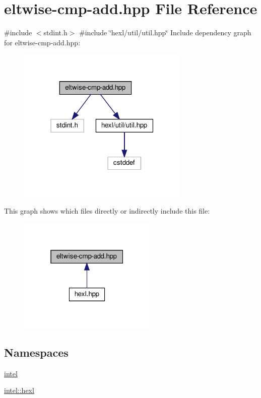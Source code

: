 \hypertarget{eltwise-cmp-add_8hpp}{}\section{eltwise-\/cmp-\/add.hpp File Reference}
\label{eltwise-cmp-add_8hpp}
{\ttfamily \#include $<$stdint.\+h$>$}\newline
{\ttfamily \#include \char`\"{}hexl/util/util.\+hpp\char`\"{}}\newline
Include dependency graph for eltwise-\/cmp-\/add.hpp\+:
\nopagebreak
\begin{figure}[H]
\begin{center}
\leavevmode
\includegraphics[width=232pt]{eltwise-cmp-add_8hpp__incl}
\end{center}
\end{figure}
This graph shows which files directly or indirectly include this file\+:
\nopagebreak
\begin{figure}[H]
\begin{center}
\leavevmode
\includegraphics[width=187pt]{eltwise-cmp-add_8hpp__dep__incl}
\end{center}
\end{figure}
\subsection*{Namespaces}
\begin{DoxyCompactItemize}
\item 
 \hyperlink{namespaceintel}{intel}
\item 
 \hyperlink{namespaceintel_1_1hexl}{intel\+::hexl}
\end{DoxyCompactItemize}
